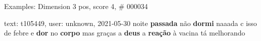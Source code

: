 \begin{frame}{Examples: Dimension 3 pos, score 4, \# 000034}
\footnotesize
\begin{exampleblock}{text: t105449, user: unknown, 2021-05-30}
noite \textbf{passada} não \textbf{dormi} naaada c isso de febre e \textbf{dor} 
no \textbf{corpo} mas graças a \textbf{deus} a \textbf{reação} à vacina tá 
melhorando  
\end{exampleblock}
\end{frame}
